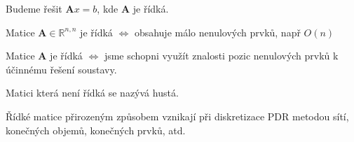 \documentclass[../main.tex]{subfiles}
\begin{document}
Budeme řešit $\mathbf{A}x = b$, kde $\mathbf{A}$ je řídká.

\begin{definition}
    Matice $\mathbf{A} \in \mathbb{R}^{n,n}$ je řídká $\Leftrightarrow$ obsahuje málo nenulových prvků, např $O(n)$
\end{definition}

\begin{definition}
    Matice $\mathbf{A}$ je řídká $\Leftrightarrow$ jsme schopni využít znalosti pozic nenulových prvků k účinnému řešení soustavy.
\end{definition}

\begin{definition}
    Matici která není řídká se nazývá hustá.
\end{definition}

\begin{remark}
    Řídké matice přirozeným způsobem vznikají při diskretizace PDR metodou sítí, konečných objemů, konečných prvků, atd. 
\end{remark}
\end{document}

